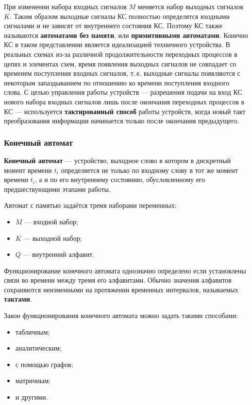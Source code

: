 \documentclass[10pt,a4paper,titlepage]{article}
\begin{document}
При изменении набора входных сигналов $M$ меняется набор выходных сигналов $K$.
Таким образом выходные сигналы КС полностью определятся входными сигналами и не зависят от внутреннего состояния КС.
Поэтому КС также называются \textbf{автоматами без памяти}, или \textbf{примитивными автоматами}.
Конечно КС в таком представлении является идеализацией техничного устройства.
В реальных схемах из-за различной продолжительности переходных процессов в цепях и элементах схем, время появления выходных сигналов не совпадает со временем поступления входных сигналов, т.\,е. выходные сигналы появляются с некоторым запаздыванием по отношению ко времени поступления входного слова.
С целью управления работы устройств --- разрешения подачи на вход КС нового набора входных сигналов лишь после окончания переходных процессов в КС --- используется \textbf{тактированный способ} работы устройств, когда новый такт преобразования информации начинается только после окончания предыдущего.

\subsubsection{Конечный автомат}

\textbf{Конечный автомат} --- устройство, выходное слово в котором в дискретный момент времени $t_i$ определяется не только по входному слову в тот же момент времени $t_i$, а и по его внутреннему состоянию, обусловленному его предшествующими этапами работы.

Автомат с памятью задаётся тремя наборами переменных:
\begin{itemize}
\item $M$ --- входной набор;
\item $K$ --- выходной набор;
\item $Q$ --- внутренний алфавит.
\end{itemize}

Функционирование конечного автомата однозначно определено если установлены связи во времени между тремя его алфавитами.
Обычно значения алфавитов сохраняются неизменными на протяжении временных интервалов, называемых \textbf{тактами}.

Закон функционирования конечного автомата можно задать такими способами:
\begin{itemize}
\item табличным;
\item аналитическим;
\item с помощью графов;
\item матричным;
\item и другими.
\end{itemize}
\end{document}
